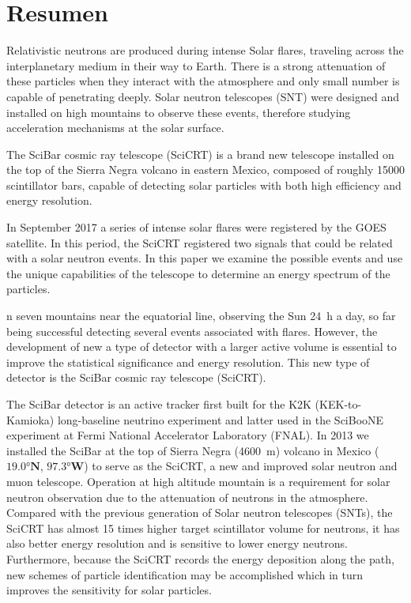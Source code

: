 \chapter{Resumen}

Relativistic neutrons are produced during intense Solar flares, traveling across the interplanetary medium in their way to Earth. There is a strong attenuation of these particles when they interact with the atmosphere and only small number is capable of penetrating deeply. Solar neutron telescopes (SNT) were designed and installed on high mountains to observe these events, therefore studying acceleration mechanisms at the solar surface.

The SciBar cosmic ray telescope (SciCRT) is a brand new telescope installed on the top of the Sierra Negra volcano in eastern Mexico, composed of roughly \num{15000} scintillator bars, capable of detecting solar particles with both high efficiency and energy resolution.


In September \num{2017} a series of intense solar flares were registered by the GOES satellite. In this period, the SciCRT registered two signals that could be related with a solar neutron events. In this paper we examine the possible events and use the unique capabilities of the telescope to determine an energy
spectrum of the particles.

n seven mountains near the equatorial line, observing the Sun \SI{24}{\hour} a day, so far being successful detecting several events associated with flares. However, the development of new a type of detector with a larger active volume is essential to improve the statistical significance and energy resolution. This new type of detector is the SciBar cosmic ray telescope  (SciCRT).

The SciBar detector is an active tracker first built for the K2K (KEK-to-Kamioka) long-baseline neutrino experiment and latter used in the SciBooNE experiment at Fermi National Accelerator Laboratory (FNAL). In \num{2013} we installed the SciBar at the top of Sierra Negra (\SI{4600}{\metre}) volcano in Mexico ($\ang{19.0}\mathbf{N}$, $\ang{97.3}\mathbf{W}$) to serve as  the SciCRT, a new and improved solar neutron and muon telescope. Operation at high altitude mountain is a requirement for solar neutron observation due to the attenuation of neutrons in the atmosphere. Compared with the previous generation of Solar neutron telescopes (SNTs), the SciCRT has almost  \num{15} times higher target scintillator volume for neutrons, it has also better energy resolution and is sensitive to lower energy neutrons. Furthermore, because the SciCRT records the energy deposition along the path, new schemes of particle identification may be accomplished which in turn improves the sensitivity for solar particles.

